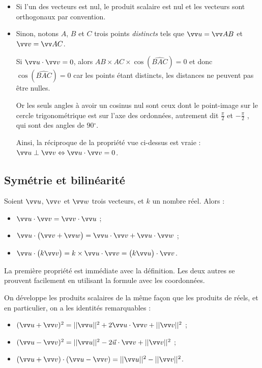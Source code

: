 \documentclass[a4paper,11pt]{article}
\begin{document}
\begin{cdemo}
\vspace{-0.2cm}
\begin{itemize}[leftmargin=*]
	\item Si l'un des vecteurs est nul, le produit scalaire est nul et les vecteurs sont orthogonaux par convention.
	\item Sinon, notons $A$, $B$ et $C$ trois points \emph{distincts} tels que $\vect{u}=\vect{AB}$ et $\vect{v}=\vect{AC}$.
	
	Si 	$\vect{u} \cdot \vect{v}=0$, alors $ AB \times AC \times \cos(\widehat{BAC})=0$ et donc $ \cos(\widehat{BAC})=0$ car les points étant distincts, les distances ne peuvent pas être nulles.
	
	Or les seuls angles à avoir un cosinus nul sont ceux dont le point-image sur le cercle trigonométrique est sur l'axe des ordonnées, autrement dit $\frac{\pi}{2}$ et $-\frac{\pi}{2}$ , qui sont des angles de $90\ensuremath{^\circ}$.
	
	Ainsi, la réciproque de la propriété vue ci-dessus est vraie :  $ \vect{u} \perp \vect{v} \ssi \vect{u}\cdot\vect{v}=0$.
\end{itemize}
\end{cdemo}

\subsection{Symétrie et bilinéarité}

\begin{cprop}[s]
Soient $\vect{u}$, $\vect{v}$ et $ \vect{w}$ trois vecteurs, et $k$ un nombre réel. Alors :
\begin{itemize}
	\item $\vect{u}\cdot\vect{v}=\vect{v}\cdot\vect{u}$ ;
	\item $\vect{u}\cdot\big(\vect{v}+ \vect{w}\big)=\vect{u}\cdot\vect{v} + \vect{u}\cdot\vect{w}$ ;
	\item $\vect{u}\cdot\big(k\vect{v}\big)=k \times \vect{u}\cdot\vect{v} = \big(k\vect{u}\big)\cdot\vect{v}$.
\end{itemize}
\end{cprop}

\begin{cdemo}
La première propriété est immédiate avec la définition. Les deux autres se prouvent facilement en utilisant la formule avec les coordonnées.
\end{cdemo}

\begin{ccscq}
On développe les produits scalaires de la même façon que les produits de réels, et en particulier, on a les identités remarquables :
\begin{itemize}
	\item $(\vect{u}+\vect{v})^2=||\vect{u}||^2+2\vect{u}\cdot\vect{v}+||\vect{v}||^2$ ;
	\item $(\vect{u}-\vect{v})^2=||\vect{u}||^2-2\vec{u}\cdot\vect{v}+||\vect{v}||^2$ ;
	\item $(\vect{u}+\vect{v})\cdot(\vect{u}-\vect{v})=||\vect{u}||^2-||\vect{v}||^2$.
\end{itemize}
\end{ccscq}
\end{document}

